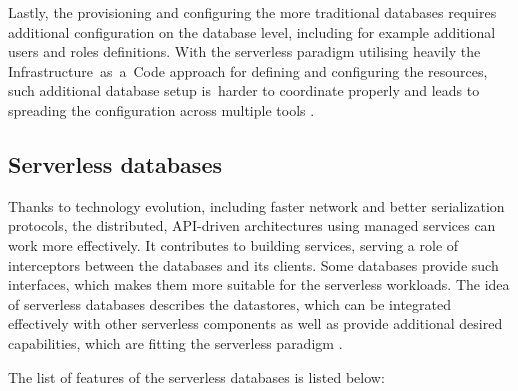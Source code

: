 Lastly, the provisioning and configuring the more traditional databases requires additional configuration on the database level, including for example additional users and roles definitions.
With the serverless paradigm utilising heavily the Infrastructure~as~a~Code approach for defining and configuring the resources, such additional database setup is~harder to coordinate properly and leads to spreading the configuration across multiple tools \cite{ServerlessAuroraWhatItMeansAndWhyItsTheFutureOfData}. 

\subsection{Serverless databases}

Thanks to technology evolution, including faster network and better serialization protocols, the distributed, API-driven architectures using managed services can work more effectively.
It contributes to building services, serving a role of interceptors between the databases and its clients.
Some databases provide such interfaces, which makes them more suitable for the serverless workloads.
The idea of serverless databases describes the datastores, which can be integrated effectively with other serverless components as well as provide additional desired capabilities, which are fitting the serverless paradigm \cite{ServerlessAuroraWhatItMeansAndWhyItsTheFutureOfData}.

The list of features of the serverless databases is listed below:

